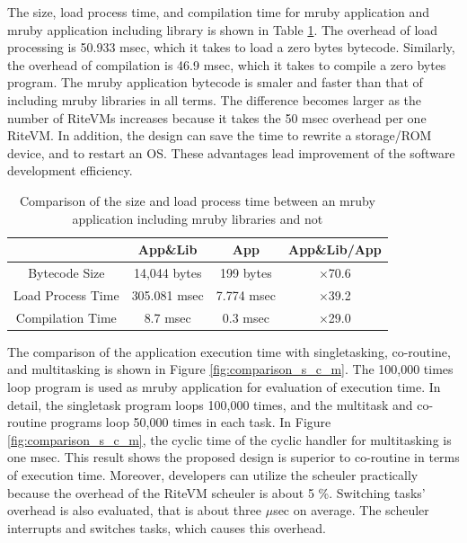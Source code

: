 \documentclass[a4j,12pt,oneside,openany,english]{jsbook}
\begin{document}
The size, load process time, and compilation time for mruby application and mruby application including library is shown in Table \ref{tab:size_and_time}.
The overhead of load processing is 50.933 msec, which it takes to load a zero bytes bytecode.
Similarly, the overhead of compilation is 46.9 msec, which it takes to compile a zero bytes program.
The mruby application bytecode is smaler and faster than that of including mruby libraries in all terms.
The difference becomes larger as the number of RiteVMs increases because it takes the 50 msec overhead per one RiteVM. 
In addition, the design can save the time to rewrite a storage/ROM device, and to restart an OS.
These advantages lead improvement of the software development efficiency.

\begin{table}[t]
    \centering
    \caption{Comparison of the size and load process time between an mruby application including mruby libraries and not}
    \begin{tabular}{c||c|c|c}
                            & App\&Lib     & App        &   App\&Lib/App  \\ \hline
          Bytecode Size     & 14,044 bytes & 199 bytes  &   $\times$70.6          \\ %
          Load Process Time & 305.081 msec & 7.774 msec &   $\times$39.2          \\
          Compilation Time  & 8.7 msec     & 0.3 msec   &   $\times$29.0          \\
    \end{tabular}
    \label{tab:size_and_time}
\end{table}

The comparison of the application execution time with singletasking, co-routine, and multitasking is shown in Figure \ref{fig:comparison_s_c_m}.
The 100,000 times loop program is used as mruby application for evaluation of execution time.
In detail, the singletask program loops 100,000 times, and the multitask and co-routine programs loop 50,000 times in each task.
In Figure \ref{fig:comparison_s_c_m}, the cyclic time of the cyclic handler for multitasking is one msec.
This result shows the proposed design is superior to co-routine in terms of execution time.
Moreover, developers can utilize the scheuler practically because the overhead of the RiteVM scheuler is about 5 \%.
Switching tasks' overhead is also evaluated, that is about three $\mu$sec on average.
The scheuler interrupts and switches tasks, which causes this overhead.
\end{document}
